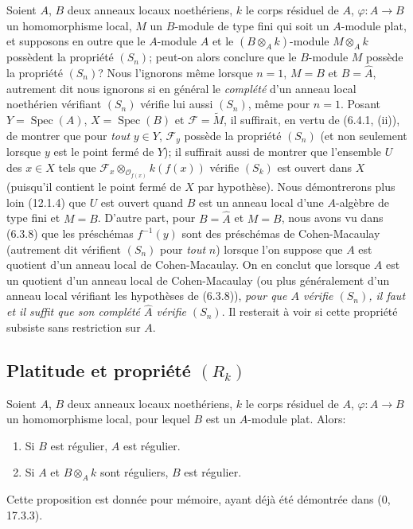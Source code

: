 \begin{remark}[6.4.3]
\label{IV.2.s6.4.3-fr}
Soient $A$, $B$ deux anneaux locaux noethériens, $k$ le corps résiduel de
$A$, $\varphi:A\to B$ un homomorphisme local, $M$ un $B$-module de type fini
qui soit un $A$-module plat, et supposons en outre que le $A$-module $A$ et le
$(B\otimes_Ak)$-module $M\otimes_Ak$ possèdent la propriété $(S_n)$; peut-on
alors conclure que le $B$-module $M$ possède la propriété $(S_n)$? Nous
l'ignorons même lorsque $n=1$, $M=B$ et $B=\widehat A$, autrement dit nous
ignorons si en général le \emph{complété} d'un anneau local noethérien
vérifiant $(S_n)$ vérifie lui aussi $(S_n)$, même pour $n=1$. Posant
$Y=\operatorname{Spec}(A)$, $X=\operatorname{Spec}(B)$ et
$\mathscr F=\widetilde M$, il suffirait, en vertu de (6.4.1, (ii)), de montrer
que pour \emph{tout} $y\in Y$, $\mathscr F_y$ possède la propriété $(S_n)$
(et non seulement lorsque $y$ est le point fermé de $Y$); il suffirait aussi
de montrer que l'ensemble $U$ des $x\in X$ tels que
$\mathscr F_x\otimes_{\mathcal O_{f(x)}}k(f(x))$ vérifie $(S_k)$ est ouvert
dans $X$ (puisqu'il contient le point fermé de $X$ par hypothèse). Nous
démontrerons plus loin (12.1.4) que $U$ est ouvert quand $B$ est un anneau
local d'une $A$-algèbre de type fini et $M=B$. D'autre part, pour
$B=\widehat A$ et $M=B$, nous avons vu dans (6.3.8) que les préschémas
$f^{-1}(y)$ sont des préschémas de Cohen-Macaulay (autrement dit vérifient
$(S_n)$ pour \emph{tout} $n$) lorsque l'on suppose que $A$ est quotient d'un
anneau local de Cohen-Macaulay. On en conclut que lorsque $A$ est un quotient
d'un anneau local de Cohen-Macaulay (ou plus généralement d'un anneau local
vérifiant les hypothèses de (6.3.8)), \emph{pour que $A$ vérifie $(S_n)$, il
faut et il suffit que son complété $\widehat A$ vérifie $(S_n)$}. Il resterait
à voir si cette propriété subsiste sans restriction sur $A$.
\end{remark}


\subsection{Platitude et propriété $(R_k)$}

\begin{proposition}[6.5.1]
\label{IV.2.s6.5.1-fr}
Soient $A$, $B$ deux anneaux locaux noethériens, $k$ le corps résiduel
de $A$, $\varphi:A\to B$ un homomorphisme local, pour lequel $B$ est un
$A$-module plat. Alors:
\begin{enumerate}
\item[(i)] Si $B$ est régulier, $A$ est régulier.
\item[(ii)] Si $A$ et $B\otimes_Ak$ sont réguliers, $B$ est régulier.
\end{enumerate}
Cette proposition est donnée pour mémoire, ayant déjà été démontrée dans
(0, 17.3.3).
\end{proposition}

